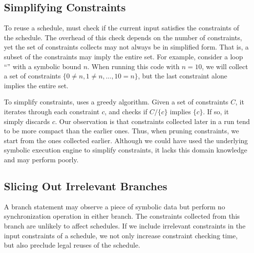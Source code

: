 



\subsection{Simplifying Constraints} \label{sec:simplify}

To reuse a schedule, \tern must check if the current input satisfies the
constraints of the schedule.  The overhead of this check depends on the
number of constraints, yet the set of constraints \tern collects may not
always be in simplified form.  That is, a subset of the constraints may
imply the entire set.  For example, consider a loop ``'' with a symbolic bound $n$.  When running this code with
$n=10$, we will collect a set of constraints $\{0 \neq n, 1 \neq n, ...,
10 = n\}$, but the last constraint alone implies the entire set.

To simplify constraints, \tern uses a greedy algorithm.  Given a set of
constraints $C$, it iterates through each constraint $c$, and checks if
$C/\{c\}$ implies $\{c\}$.  If so, it simply discards $c$.  Our
observation is that constraints collected later in a run tend to be more
compact than the earlier ones.  Thus, when pruning constraints, we start
from the ones collected earlier.  Although we could have used the
underlying symbolic execution engine to simplify constraints, it lacks
this domain knowledge and may perform poorly.

\subsection{Slicing Out Irrelevant Branches} \label{sec:slicing}

A branch statement may observe a piece of symbolic data but perform no
synchronization operation in either branch.  The constraints collected
from this branch are unlikely to affect schedules.  If we include
irrelevant constraints in the input constraints of a schedule, we not only
increase constraint checking time, but also preclude legal reuses of the
schedule.

